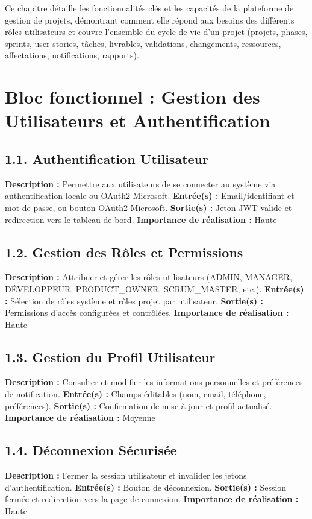 Ce chapitre détaille les fonctionnalités clés et les capacités de la plateforme de gestion de projets, démontrant comment elle répond aux besoins des différents rôles utilisateurs et couvre l'ensemble du cycle de vie d'un projet (projets, phases, sprints, user stories, tâches, livrables, validations, changements, ressources, affectations, notifications, rapports).

\section{Bloc fonctionnel : Gestion des Utilisateurs et Authentification}

\subsection{1.1. Authentification Utilisateur}
\textbf{Description :} Permettre aux utilisateurs de se connecter au système via authentification locale ou OAuth2 Microsoft.
\textbf{Entrée(s) :} Email/identifiant et mot de passe, ou bouton OAuth2 Microsoft.
\textbf{Sortie(s) :} Jeton JWT valide et redirection vers le tableau de bord.
\textbf{Importance de réalisation :} Haute

\subsection{1.2. Gestion des Rôles et Permissions}
\textbf{Description :} Attribuer et gérer les rôles utilisateurs (ADMIN, MANAGER, DÉVELOPPEUR, PRODUCT\_OWNER, SCRUM\_MASTER, etc.).
\textbf{Entrée(s) :} Sélection de rôles système et rôles projet par utilisateur.
\textbf{Sortie(s) :} Permissions d'accès configurées et contrôlées.
\textbf{Importance de réalisation :} Haute

\subsection{1.3. Gestion du Profil Utilisateur}
\textbf{Description :} Consulter et modifier les informations personnelles et préférences de notification.
\textbf{Entrée(s) :} Champs éditables (nom, email, téléphone, préférences).
\textbf{Sortie(s) :} Confirmation de mise à jour et profil actualisé.
\textbf{Importance de réalisation :} Moyenne

\subsection{1.4. Déconnexion Sécurisée}
\textbf{Description :} Fermer la session utilisateur et invalider les jetons d'authentification.
\textbf{Entrée(s) :} Bouton de déconnexion.
\textbf{Sortie(s) :} Session fermée et redirection vers la page de connexion.
\textbf{Importance de réalisation :} Haute


